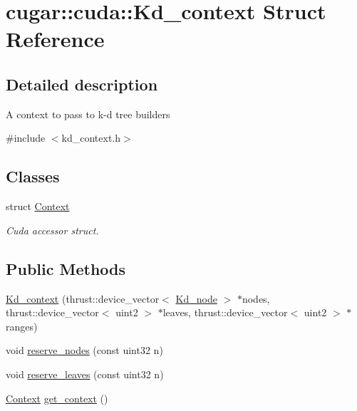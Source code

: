 \hypertarget{structcugar_1_1cuda_1_1_kd__context}{}\section{cugar\+:\+:cuda\+:\+:Kd\+\_\+context Struct Reference}
\label{structcugar_1_1cuda_1_1_kd__context}


\subsection{Detailed description}
A context to pass to k-\/d tree builders 

{\ttfamily \#include $<$kd\+\_\+context.\+h$>$}

\subsection*{Classes}
\begin{DoxyCompactItemize}
\item 
struct \hyperlink{structcugar_1_1cuda_1_1_kd__context_1_1_context}{Context}
\begin{DoxyCompactList}\small\item\em Cuda accessor struct. \end{DoxyCompactList}\end{DoxyCompactItemize}
\subsection*{Public Methods}
\begin{DoxyCompactItemize}
\item 
\hyperlink{structcugar_1_1cuda_1_1_kd__context_a654bb141ef5aee074a05d56cfcac3ca1}{Kd\+\_\+context} (thrust\+::device\+\_\+vector$<$ \hyperlink{structcugar_1_1_kd__node}{Kd\+\_\+node} $>$ $\ast$nodes, thrust\+::device\+\_\+vector$<$ uint2 $>$ $\ast$leaves, thrust\+::device\+\_\+vector$<$ uint2 $>$ $\ast$ranges)
\item 
void \hyperlink{structcugar_1_1cuda_1_1_kd__context_a5c97fca7fe7ce898fdf17f7406d5efc8}{reserve\+\_\+nodes} (const uint32 n)
\item 
void \hyperlink{structcugar_1_1cuda_1_1_kd__context_a7bc572a4cd5bc3879cd54d86c4735863}{reserve\+\_\+leaves} (const uint32 n)
\item 
\hyperlink{structcugar_1_1cuda_1_1_kd__context_1_1_context}{Context} \hyperlink{structcugar_1_1cuda_1_1_kd__context_ab5a0d97da3fcddd94a9673eb6a3c529d}{get\+\_\+context} ()
\end{DoxyCompactItemize}
